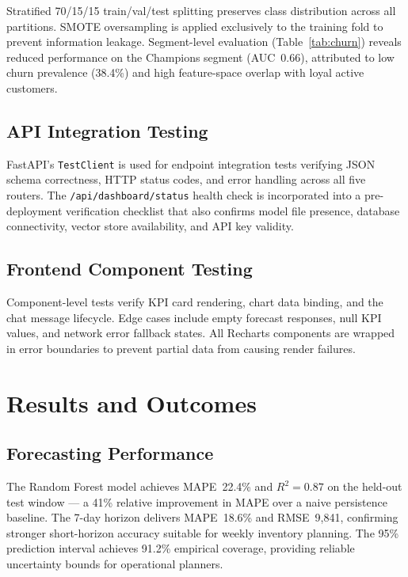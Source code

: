 \documentclass[conference]{IEEEtran}
\begin{document}
Stratified 70/15/15 train/val/test splitting preserves class distribution across
all partitions.  SMOTE oversampling is applied exclusively to the training fold to
prevent information leakage.  Segment-level evaluation (Table~\ref{tab:churn}) reveals
reduced performance on the Champions segment (AUC~0.66), attributed to low churn
prevalence (38.4\%) and high feature-space overlap with loyal active customers.

\subsection{API Integration Testing}

FastAPI's \texttt{TestClient} is used for endpoint integration tests verifying JSON
schema correctness, HTTP status codes, and error handling across all five routers.
The \texttt{/api/dashboard/status} health check is incorporated into a pre-deployment
verification checklist that also confirms model file presence, database connectivity,
vector store availability, and API key validity.

\subsection{Frontend Component Testing}

Component-level tests verify KPI card rendering, chart data binding, and the chat
message lifecycle.  Edge cases include empty forecast responses, null KPI values,
and network error fallback states.  All Recharts components are wrapped in error
boundaries to prevent partial data from causing render failures.

\section{Results and Outcomes}

\subsection{Forecasting Performance}

The Random Forest model achieves MAPE~22.4\% and $R^{2}\!=\!0.87$ on the held-out
test window — a 41\% relative improvement in MAPE over a naive persistence baseline.
The 7-day horizon delivers MAPE~18.6\% and RMSE~9{,}841, confirming stronger
short-horizon accuracy suitable for weekly inventory planning.  The 95\% prediction
interval achieves 91.2\% empirical coverage, providing reliable uncertainty bounds
for operational planners.
\end{document}
